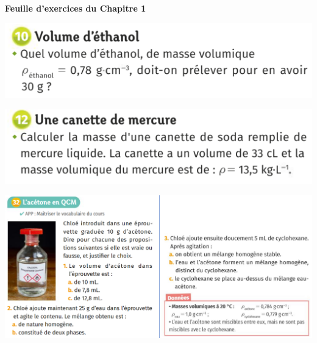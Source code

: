 \renewcommand{\thesubsection}{\textcolor{red}{\Roman{section}.\arabic{subsection}}}
\renewcommand{\thesubsubsection}{\textcolor{red}{\Roman{section}.\arabic{subsection}.\alph{subsubsection}}}

\setcounter{section}{0}

\begin{center}
\begin{mdframed}[style=titr, leftmargin=60pt, rightmargin=60pt, innertopmargin=7pt, innerbottommargin=7pt, innerrightmargin=8pt, innerleftmargin=8pt]

\begin{center}
\large{\textbf{Feuille d'exercices du Chapitre 1}}
\end{center}

\end{mdframed}
\end{center}

\includegraphics[scale=0.9]{Images/Exo_1_Chap1.png}
\vspace{1cm}

\includegraphics[scale=0.9]{Images/Exo_2_Chap1.png}
\vspace{1cm}

\includegraphics[scale=0.7]{Images/Exo_32_Chap1.png}
\vspace{1cm}

